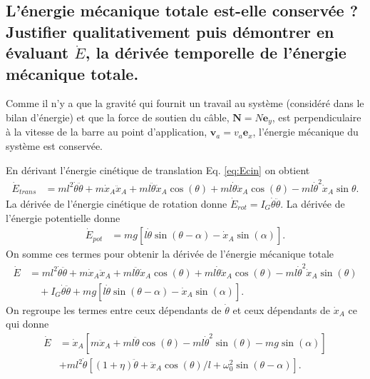 \documentclass[11pt,a4paper]{exam}
\newcommand{\exACDH}{\bm e_x}
\newcommand{\eyACDH}{\bm e_y}
\begin{document}
\begin{parts}
\part{L'énergie mécanique totale est-elle conservée ? Justifier qualitativement puis démontrer en évaluant $\dot E$, la dérivée temporelle de l'énergie mécanique totale.}
    \par\vspace{2mm}
    Comme il n'y a que la gravité qui fournit un travail au système (considéré dans le bilan d'énergie) et que la force de soutien du câble, $\bm N=N\eyACDH$, est perpendiculaire à la vitesse de la barre au point d'application, $\bm v_a = v_a \exACDH $, l'énergie mécanique du système est conservée.
    \par\vspace{2mm}
    En dérivant l'énergie cinétique de translation Eq. \eqref{eq:Ecin} on obtient
    \begin{align}
        \dot E_{trans}&= ml^2\dot\theta\ddot\theta + m\dot x_A \ddot x_A +ml\ddot\theta \dot x_A \cos(\theta) + ml\dot\theta \ddot x_A \cos(\theta) - ml\dot\theta^2 \dot x_A \sin \theta.
    \end{align}
    La dérivée de l'énergie cinétique de rotation donne $\dot E_{rot}=I_G\dot\theta\ddot \theta$.
    La dérivée de l'énergie potentielle donne
    \begin{align}
        \dot E_{pot} &= mg\left[l\dot\theta \sin(\theta-\alpha) - \dot x_A\sin(\alpha)\right].
    \end{align}
    On somme ces termes pour obtenir la dérivée de l'énergie mécanique totale
    \begin{align}
        \dot E &= ml^2\dot\theta\ddot\theta + m\dot x_A \ddot x_A +ml\ddot\theta \dot x_A \cos(\theta) + ml\dot\theta \ddot x_A \cos(\theta) - ml\dot\theta^2 \dot x_A \sin(\theta) \nonumber\\
        &\quad + I_G\dot\theta\ddot \theta + mg\left[l\dot\theta \sin(\theta-\alpha) - \dot x_A\sin(\alpha)\right].
    \end{align}
    On regroupe les termes entre ceux dépendants de $\dot\theta$ et ceux dépendants de $\dot x_A$ ce qui donne
    \begin{align}
        \dot E &= \dot x_A \left[m\ddot x_A +ml\ddot\theta \cos(\theta) - ml\dot\theta^2 \sin(\theta) - mg\sin(\alpha)\right]\nonumber\\
        &+ ml^2 \dot \theta \left[(1+\eta)\ddot\theta + \ddot x_A \cos(\theta)/l + \omega_0^2\sin(\theta-\alpha)\right].

\end{align}
\end{parts}
\end{document}
